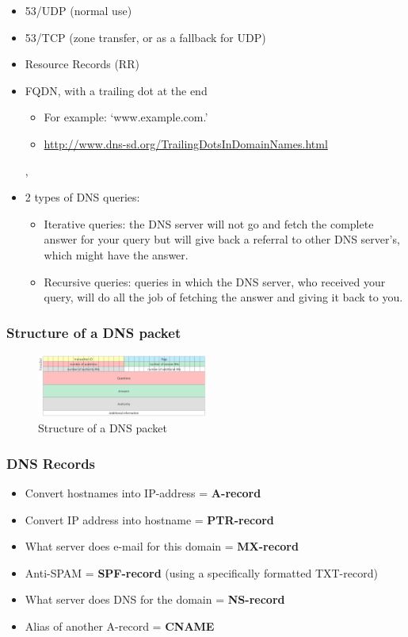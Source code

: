 \documentclass{article}
\begin{document}
\begin{itemize}
    \item 53/UDP (normal use)
    \item 53/TCP (zone transfer, or as a fallback for UDP)
    \item Resource Records (RR)
    \item FQDN, with a trailing dot at the end
    \begin{itemize}
        \item For example: `www.example.com.'
        \item \url{http://www.dns-sd.org/TrailingDotsInDomainNames.html}
    \end{itemize}, 
    \item 2 types of DNS queries:
    \begin{itemize}
        \item Iterative queries: the DNS server will not go and fetch the complete answer for your query but will give back a referral to other DNS server’s, which might have the answer.
        \item Recursive queries: queries in which the DNS server, who received your query, will do all the job of fetching the answer and giving it back to you.
    \end{itemize}
\end{itemize}

\subsubsection{Structure of a DNS packet}

\begin{figure}[H]
    \centering
    \includegraphics[width=0.5\textwidth]{dns-structure.png}
    \caption{Structure of a DNS packet}
\end{figure}

\subsubsection{DNS Records}

\begin{itemize}
    \item Convert hostnames into IP-address = \textbf{A-record}
    \item Convert IP address into hostname = \textbf{PTR-record}
    \item What server does e-mail for this domain = \textbf{MX-record}
    \item Anti-SPAM = \textbf{SPF-record} (using a specifically formatted TXT-record)
    \item What server does DNS for the domain = \textbf{NS-record}
    \item Alias of another A-record = \textbf{CNAME}
\end{itemize}
\end{document}
